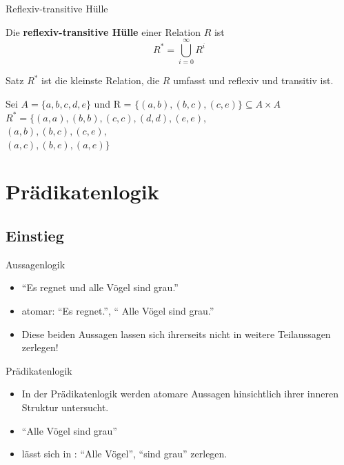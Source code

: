 \begin{frame}{Reflexiv-transitive Hülle}
	\begin{Definition}
		Die \textbf{reflexiv-transitive Hülle} einer Relation $R$ ist
		$$R^\ast = \bigcup \limits_{i=0}^\infty R^i$$
	\end{Definition}

	\pause
	\begin{block}{Satz}
		$R^*$ ist die kleinste Relation, die $R$ umfasst und reflexiv und
		transitiv ist.
	\end{block}

	\pause
	\begin{Beispiel}
		Sei $A = \{a, b, c, d, e\}$ und R = $\{(a, b), (b, c), (c, e)\} \subseteq A \times A$\\ \pause
		$R^*=\{(a,a), (b,b), (c,c), (d,d), (e,e),$ \\
		$(a,b), (b,c), (c,e),$ \\
		$(a,c), (b,e),(a,e)\}$
	\end{Beispiel}
	
\end{frame}

\section{Prädikatenlogik}
\newcommand{\plB}{\plfoo{B}}
\newcommand{\plE}{\plfoo{E}}

\subsection{Einstieg}
\begin{frame}{}
	\begin{block} {Aussagenlogik}
	\begin{itemize}
		\item \enquote{Es regnet und alle Vögel sind grau.}
		\item atomar: \enquote{Es regnet.}, \enquote{ Alle Vögel sind grau.}
		\item Diese beiden Aussagen lassen sich ihrerseits nicht in weitere Teilaussagen zerlegen!
	\end{itemize}
	\end{block}

	\pause
	\begin{block} {Prädikatenlogik}	
		\begin{itemize}
		\item In der Prädikatenlogik werden atomare Aussagen hinsichtlich ihrer inneren Struktur untersucht.
		\item \enquote{Alle Vögel sind grau}
		\item lässt sich in : \enquote{Alle Vögel}, \enquote{sind grau} zerlegen.
	\end{itemize}
	
	\end{block}
\end{frame}

